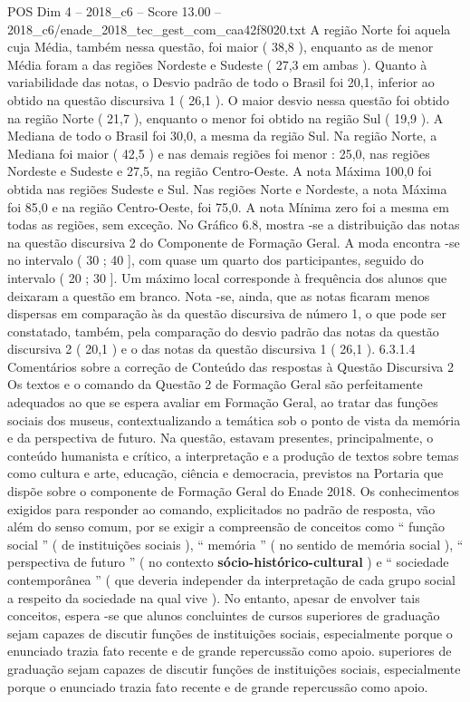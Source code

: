 \begin{textsample}{POS Dim 4 – 2018\_c6 – Score 13.00 – 2018\_c6/enade\_2018\_tec\_gest\_com\_caa42f8020.txt}
A região Norte foi aquela cuja Média, também nessa questão, foi maior ( 38,8 ), enquanto as de menor Média foram a das regiões Nordeste e Sudeste ( 27,3 em ambas ).
Quanto à variabilidade das notas, o Desvio padrão de todo o Brasil foi 20,1, inferior ao obtido na questão discursiva 1 ( 26,1 ).
O maior desvio nessa questão foi obtido na região Norte ( 21,7 ), enquanto o menor foi obtido na região Sul ( 19,9 ).
A Mediana de todo o Brasil foi 30,0, a mesma da região Sul.
Na região Norte, a Mediana foi maior ( 42,5 ) e nas demais regiões foi menor : 25,0, nas regiões Nordeste e Sudeste e 27,5, na região Centro-Oeste.
A nota Máxima 100,0 foi obtida nas regiões Sudeste e Sul.
Nas regiões Norte e Nordeste, a nota Máxima foi 85,0 e na região Centro-Oeste, foi 75,0.
A nota Mínima zero foi a mesma em todas as regiões, sem exceção.
No Gráfico 6.8, mostra -se a distribuição das notas na questão discursiva 2 do Componente de Formação Geral.
A moda encontra -se no intervalo ( 30 ; 40 ], com quase um quarto dos participantes, seguido do intervalo ( 20 ; 30 ].
Um máximo local corresponde à frequência dos alunos que deixaram a questão em branco.
Nota -se, ainda, que as notas ficaram menos dispersas em comparação às da questão discursiva de número 1, o que pode ser constatado, também, pela comparação do desvio padrão das notas da questão discursiva 2 ( 20,1 ) e o das notas da questão discursiva 1 ( 26,1 ). 6.3.1.4 Comentários sobre a correção de Conteúdo das respostas à Questão Discursiva 2 Os textos e o comando da Questão 2 de Formação Geral são perfeitamente adequados ao que se espera avaliar em Formação Geral, ao tratar das funções sociais dos museus, contextualizando a temática sob o ponto de vista da memória e da perspectiva de futuro.
Na questão, estavam presentes, principalmente, o conteúdo humanista e crítico, a interpretação e a produção de textos sobre temas como cultura e arte, educação, ciência e democracia, previstos na Portaria que dispõe sobre o componente de Formação Geral do Enade 2018.
Os conhecimentos exigidos para responder ao comando, explicitados no padrão de resposta, vão além do senso comum, por se exigir a compreensão de conceitos como “ função social ” ( de instituições sociais ), “ memória ” ( no sentido de memória social ), “ perspectiva de futuro ” ( no contexto \textbf{sócio-histórico-cultural} ) e “ sociedade contemporânea ” ( que deveria independer da interpretação de cada grupo social a respeito da sociedade na qual vive ).
No entanto, apesar de envolver tais conceitos, espera -se que alunos concluintes de cursos superiores de graduação sejam capazes de discutir funções de instituições sociais, especialmente porque o enunciado trazia fato recente e de grande repercussão como apoio. superiores de graduação sejam capazes de discutir funções de instituições sociais, especialmente porque o enunciado trazia fato recente e de grande repercussão como apoio.

\end{textsample}
